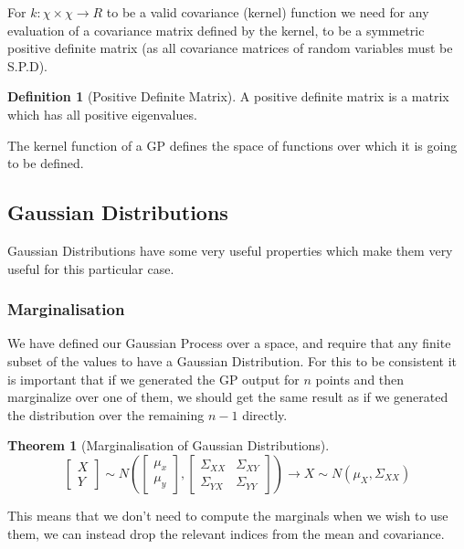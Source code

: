 \documentclass[12pt, a4paper]{report}
\theoremstyle{definition}
\newtheorem{theorem}{Theorem}[section]
\theoremstyle{definition}
\newtheorem{definition}{Definition}[section]
\theoremstyle{definition}
\begin{document}
For $k: \chi \times \chi \rightarrow R$ to be a valid covariance (kernel) function we need for any evaluation of a covariance matrix defined by the kernel, to be a symmetric positive definite matrix (as all covariance matrices of random variables must be S.P.D).

\begin{definition}[Positive Definite Matrix]
    A positive definite matrix is a matrix which has all positive eigenvalues.
\end{definition}

The kernel function of a GP defines the space of functions over which it is going to be defined.

\subsection{Gaussian Distributions}

Gaussian Distributions have some very useful properties which make them very useful for this particular case.


\subsubsection{Marginalisation}

We have defined our Gaussian Process over a space, and require that any finite subset of the values to have a Gaussian Distribution. For this to be consistent it is important that if we generated the GP output for $n$ points and then marginalize over one of them, we should get the same result as if we generated the distribution over the remaining $n-1$ directly.

\begin{theorem}[Marginalisation of Gaussian Distributions]
 $$ \begin{bmatrix}
     X \\ Y
 \end{bmatrix} \sim N \left(\begin{bmatrix}
     \mu_x \\ 
     \mu_y
 \end{bmatrix}, \begin{bmatrix}
     \Sigma_{XX} & \Sigma_{XY} \\
     \Sigma_{YX} & \Sigma_{YY}
 \end{bmatrix} \right) \rightarrow X \sim N \left(\mu_X, \Sigma_{XX} \right)$$
\end{theorem}

This means that we don't need to compute the marginals when we wish to use them, we can instead drop the relevant indices from the mean and covariance.
 
\end{document}
